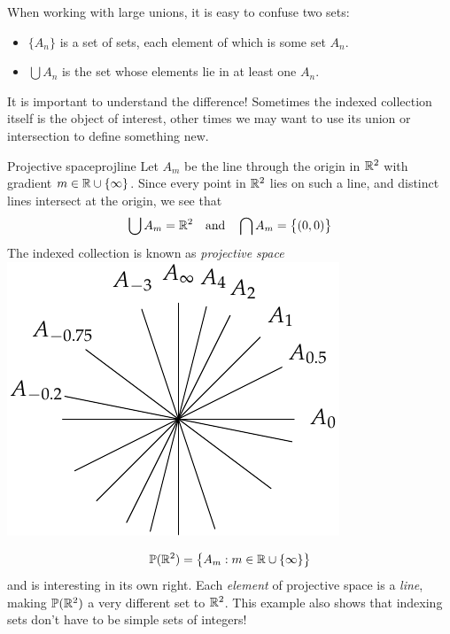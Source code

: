 
When working with large unions, it is easy to confuse two sets:
\begin{itemize}\itemsep2pt
  \item $\{A_n\}$ is a set of sets, each element of which is some set $A_n$.
  \item $\bigcup A_n$ is the set whose elements lie in at least one $A_n$.
\end{itemize}
It is important to understand the difference! Sometimes the indexed collection itself is the object of interest, other times we may want to use its union or intersection to define something new.



\begin{example}[lower separated=false, sidebyside, sidebyside align=top seam, sidebyside gap=0pt, righthand width=0.3\linewidth]{Projective space}{projline}
	Let $A_m$ be the line\footnotemark{} through the origin in $\mathbb{R}^2$ with gradient $m\in\mathbb{R}\cup\{\infty\}$. 	Since every point in $\mathbb{R}^2$ lies on such a line, and distinct lines intersect at the origin, we see that
	\[
		\bigcup A_m=\mathbb{R}^2 \quad \text{and} \quad \bigcap A_m=\bigl\{(0,0)\bigr\}
	\]
  The indexed collection is known as \emph{projective space} 
  \tcblower
	\hfill\includegraphics[scale=0.85]{setsii-03-projective}
\end{example}

\vspace*{-45pt}

\begin{tcolorbox}[exstyle]
	\[
  	\mathbb{P}(\mathbb{R}^2)=\bigl\{A_m:m\in \mathbb{R}\cup\{\infty\}\bigr\}
  \]
	and is interesting in its own right. Each \emph{element} of projective space is a \emph{line}, making $\mathbb{P}(\mathbb{R}^2)$ a very different set to $\mathbb{R}^2$. This example also shows that indexing sets don't have to be simple sets of integers! %
\end{tcolorbox}

